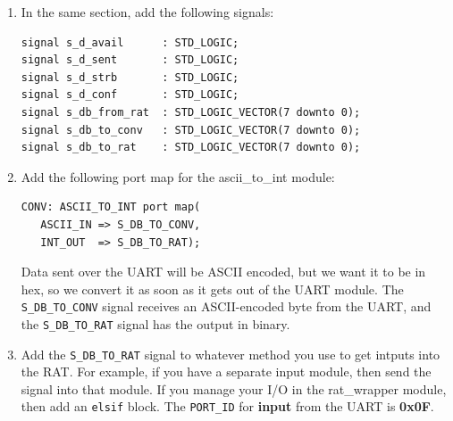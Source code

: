 \documentclass[notitlepage]{article}
\begin{document}
\begin {enumerate}
\begin{verbatim}
component ascii_to_int
   Port(
      ascii_in : in     STD_LOGIC_VECTOR(7 downto 0);
      int_out  : out    STD_LOGIC_VECTOR(7 downto 0));
end component;
\end{verbatim}

\item In the same section, add the following signals:
\begin{verbatim}
signal s_d_avail      : STD_LOGIC;
signal s_d_sent       : STD_LOGIC;
signal s_d_strb       : STD_LOGIC;
signal s_d_conf       : STD_LOGIC;
signal s_db_from_rat  : STD_LOGIC_VECTOR(7 downto 0);
signal s_db_to_conv   : STD_LOGIC_VECTOR(7 downto 0);
signal s_db_to_rat    : STD_LOGIC_VECTOR(7 downto 0);
\end{verbatim}

\item Add the following port map for the ascii\_to\_int module:
\begin{verbatim}
CONV: ASCII_TO_INT port map(
   ASCII_IN => S_DB_TO_CONV,
   INT_OUT  => S_DB_TO_RAT);
\end{verbatim}
Data sent over the UART will be ASCII encoded, but we want it to be in hex, so we convert it as soon as it gets out of the UART module. The \texttt{S\_DB\_TO\_CONV} signal receives an ASCII-encoded byte from the UART, and the \texttt{S\_DB\_TO\_RAT} signal has the output in binary.

\item Add the \texttt{S\_DB\_TO\_RAT} signal to whatever method you use to get intputs into the RAT. For example, if you have a  separate input module, then send the signal into that module. If you manage your I/O in the rat\_wrapper module, then add an \texttt{elsif} block. The \texttt{PORT\_ID} for \textbf{input} from the UART is \textbf{0x0F}.


\end{enumerate}
\end{document}
